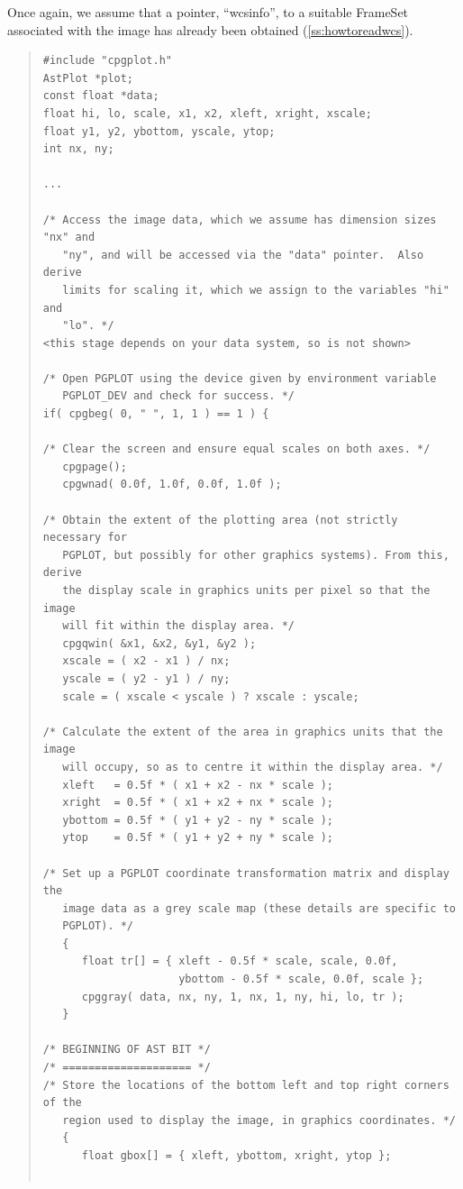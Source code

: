 \documentclass[twoside,11pt]{article}
\newcommand{\htmlref}[2]{#1}
\newcommand{\secref}[1]{\S\ref{#1}}
\renewcommand{\secref}[1]{\ref{#1}}
\begin{document}
Once again, we assume that a pointer, ``wcsinfo'', to a suitable
\htmlref{FrameSet}{FrameSet} associated with the image has already been obtained
(\secref{ss:howtoreadwcs}).

\begin{quote}
\small
\begin{verbatim}
#include "cpgplot.h"
AstPlot *plot;
const float *data;
float hi, lo, scale, x1, x2, xleft, xright, xscale;
float y1, y2, ybottom, yscale, ytop;
int nx, ny;

...

/* Access the image data, which we assume has dimension sizes "nx" and
   "ny", and will be accessed via the "data" pointer.  Also derive
   limits for scaling it, which we assign to the variables "hi" and
   "lo". */
<this stage depends on your data system, so is not shown>

/* Open PGPLOT using the device given by environment variable
   PGPLOT_DEV and check for success. */
if( cpgbeg( 0, " ", 1, 1 ) == 1 ) {

/* Clear the screen and ensure equal scales on both axes. */
   cpgpage();
   cpgwnad( 0.0f, 1.0f, 0.0f, 1.0f );

/* Obtain the extent of the plotting area (not strictly necessary for
   PGPLOT, but possibly for other graphics systems). From this, derive
   the display scale in graphics units per pixel so that the image
   will fit within the display area. */
   cpgqwin( &x1, &x2, &y1, &y2 );
   xscale = ( x2 - x1 ) / nx;
   yscale = ( y2 - y1 ) / ny;
   scale = ( xscale < yscale ) ? xscale : yscale;

/* Calculate the extent of the area in graphics units that the image
   will occupy, so as to centre it within the display area. */
   xleft   = 0.5f * ( x1 + x2 - nx * scale );
   xright  = 0.5f * ( x1 + x2 + nx * scale );
   ybottom = 0.5f * ( y1 + y2 - ny * scale );
   ytop    = 0.5f * ( y1 + y2 + ny * scale );

/* Set up a PGPLOT coordinate transformation matrix and display the
   image data as a grey scale map (these details are specific to
   PGPLOT). */
   {
      float tr[] = { xleft - 0.5f * scale, scale, 0.0f,
                     ybottom - 0.5f * scale, 0.0f, scale };
      cpggray( data, nx, ny, 1, nx, 1, ny, hi, lo, tr );
   }

/* BEGINNING OF AST BIT */
/* ==================== */
/* Store the locations of the bottom left and top right corners of the
   region used to display the image, in graphics coordinates. */
   {
      float gbox[] = { xleft, ybottom, xright, ytop };


\end{verbatim}
\end{quote}
\end{document}
